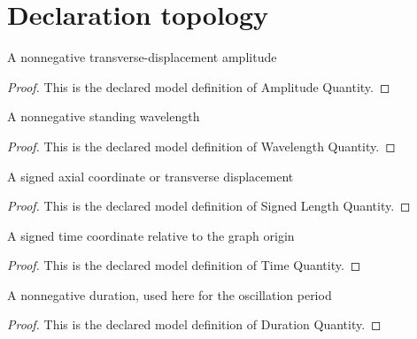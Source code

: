 \section{Declaration topology}
\begin{definition}
  \label{def:physics:phyx-mini-0296:phyxminiproblems-problemphyxmini0296-amplitudequantity}
  A nonnegative transverse-displacement amplitude
\end{definition}
\begin{proof}
  This is the declared model definition of Amplitude Quantity.
\end{proof}
\begin{definition}
  \label{def:physics:phyx-mini-0296:phyxminiproblems-problemphyxmini0296-wavelengthquantity}
  A nonnegative standing wavelength
\end{definition}
\begin{proof}
  This is the declared model definition of Wavelength Quantity.
\end{proof}
\begin{definition}
  \label{def:physics:phyx-mini-0296:phyxminiproblems-problemphyxmini0296-signedlengthquantity}
  A signed axial coordinate or transverse displacement
\end{definition}
\begin{proof}
  This is the declared model definition of Signed Length Quantity.
\end{proof}
\begin{definition}
  \label{def:physics:phyx-mini-0296:phyxminiproblems-problemphyxmini0296-timequantity}
  A signed time coordinate relative to the graph origin
\end{definition}
\begin{proof}
  This is the declared model definition of Time Quantity.
\end{proof}
\begin{definition}
  \label{def:physics:phyx-mini-0296:phyxminiproblems-problemphyxmini0296-durationquantity}
  A nonnegative duration, used here for the oscillation period
\end{definition}
\begin{proof}
  This is the declared model definition of Duration Quantity.
\end{proof}

